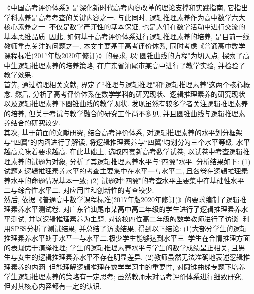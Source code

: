  


 \begin{cabstract}
《中国高考评价体系》是深化新时代高考内容改革的理论支撑和实践指南, 它指出学科素养是高考考查的关键内容之一. 与此同时, 逻辑推理素养作为高中数学六大核心素养之一, 不仅是数学严谨性的基本保证, 也是人们在数学活动中进行交流的基本思维品质. 因此, 如何基于高考评价体系进行逻辑推理素养的培养, 是目前一线教师重点关注的问题之一. 本文主要基于高考评价体系, 同时考虑《普通高中数学课程标准(2017年版2020年修订)》的要求, 以``圆锥曲线的方程"为切入点, 探索了高中生逻辑推理素养的培养策略, 在广东省汕尾市某高中进行了教学实验, 并检验了教学效果. 
\\
\indent
首先, 通过梳理相关文献, 界定了``推理与逻辑推理"和``逻辑推理素养"这两个核心概念. 然后, 分析了高考评价体系在数学学科的研究现状、逻辑推理素养的研究现状以及逻辑推理素养下圆锥曲线的教学现状. 发现虽然有较多学者关注逻辑推理素养的培养, 但关于考试与教学融合的研究工作尚不多见, 并且圆锥曲线与逻辑推理素养结合的研究较少.
\\
\indent
其次, 基于前面的文献研究, 结合高考评价体系, 对逻辑推理素养的水平划分框架与``四翼"的内涵进行了解读, 将逻辑推理素养与``四翼"均划分为三个水平等级, 水平越高意味着要求越高. 在此基础上, 选取四套新高考数学试卷, 以试卷中考查逻辑推理素养的试题为对象, 分析了其逻辑推理素养水平与``四翼"水平. 分析结果如下: (1) 试题对逻辑推理素养水平的考查主要集中在水平一与水平二, 且各卷在逻辑推理素养水平的命题情况基本一致;  (2) 试题对``四翼"的考查水平主要集中在基础性水平二与综合性水平二, 对应用性和创新性的考查较少. 
\\
\indent
然后, 依据《普通高中数学课程标准(2017年版2020年修订)》的要求编制了逻辑推理素养水平测试卷, 对广东省汕尾市某高中高二年级的学生进行了逻辑推理素养水平测试, 并以逻辑推理素养为主题, 对该校四位高二年级的数学教师进行了访谈. 利用SPSS分析了测试结果, 并总结了访谈结果, 得到以下结论: (1)大部分学生的逻辑推理素养水平处于水平一与水平二,极少学生能够达到水平三; 学生在合情推理方面的表现优于演绎推理; 学生的逻辑推理素养水平与学生的数学成绩呈正相关, 且男生与女生的逻辑推理素养水平不存在明显差异. (2)教师虽然无法准确地表述逻辑推理素养的内涵, 但能理解逻辑推理在数学学习中的重要性, 对圆锥曲线专题下培养学生逻辑推理素养的策略有一定思考; 虽然教师未对高考评价体系进行细致研究, 但对其核心内容都有一定的认识. 

\end{cabstract}
